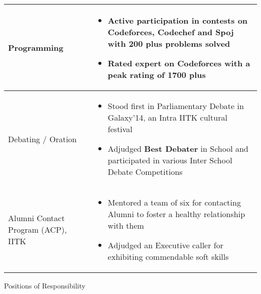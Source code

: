\documentclass{article}
\begin{document}
\begin{tabular}{| P{3cm} |  P{15.4cm}|}
\hline
\vspace{0.3cm}Programming & \vspace{-0.4cm}\begin{itemize}[leftmargin=0.3cm]
\setlength\itemsep{0.2pt}
\item Active participation in contests on Codeforces, Codechef and Spoj with \textbf{200 plus} problems solved
\item Rated expert on Codeforces with a peak rating of \textbf{1700 plus}
\end{itemize}\\
\hline
\vspace{0.3cm}Debating / Oration & \vspace{-0.4cm}\begin{itemize}[leftmargin=0.3cm]
\setlength\itemsep{0.2pt}
\item Stood first in Parliamentary Debate in Galaxy'14, an Intra IITK cultural festival 
\item Adjudged \textbf{Best Debater} in School and participated in various Inter School Debate Competitions
\end{itemize}\\
\hline
\vspace{0cm}Alumni Contact Program (ACP), IITK & \vspace{-0.4cm}\begin{itemize}[leftmargin=0.3cm]
\setlength\itemsep{0.2pt}
\item Mentored a team of six for contacting Alumni to foster a healthy relationship with them
\item Adjudged an Executive caller for exhibiting commendable soft skills\end{itemize}\\
\hline
\end{tabular}\vspace{0.2cm}
{\Large Positions of Responsibility}
\newline
\newline
\end{document}
